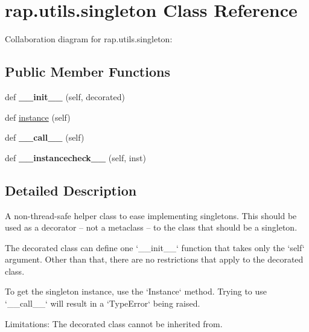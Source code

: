 \hypertarget{classrap_1_1utils_1_1singleton}{}\section{rap.\+utils.\+singleton Class Reference}
\label{classrap_1_1utils_1_1singleton}


Collaboration diagram for rap.\+utils.\+singleton\+:
\subsection*{Public Member Functions}
\begin{DoxyCompactItemize}
\item 
\mbox{\label{classrap_1_1utils_1_1singleton_a95e6da4ecb56d4e8704fad01d658ede1}} 
def {\bfseries \+\_\+\+\_\+init\+\_\+\+\_\+} (self, decorated)
\item 
def \hyperlink{classrap_1_1utils_1_1singleton_a73cd49c901fb1b01c3afe3cefd773e00}{instance} (self)
\item 
\mbox{\label{classrap_1_1utils_1_1singleton_a11f303f7a146fd6a80af178970397bc9}} 
def {\bfseries \+\_\+\+\_\+call\+\_\+\+\_\+} (self)
\item 
\mbox{\label{classrap_1_1utils_1_1singleton_a8621a6e410a03d568b483692fa4f196a}} 
def {\bfseries \+\_\+\+\_\+instancecheck\+\_\+\+\_\+} (self, inst)
\end{DoxyCompactItemize}


\subsection{Detailed Description}
\begin{DoxyVerb}A non-thread-safe helper class to ease implementing singletons.
This should be used as a decorator -- not a metaclass -- to the
class that should be a singleton.

The decorated class can define one `__init__` function that
takes only the `self` argument. Other than that, there are
no restrictions that apply to the decorated class.

To get the singleton instance, use the `Instance` method. Trying
to use `__call__` will result in a `TypeError` being raised.

Limitations: The decorated class cannot be inherited from.\end{DoxyVerb}
 

